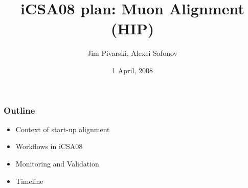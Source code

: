 \documentclass[compress]{beamer}
\title{iCSA08 plan: Muon Alignment (HIP)}
\author{Jim Pivarski, Alexei Safonov}
\institute{Texas A\&M University}
\date{ 1 April, 2008}
\begin{document}
\frame{\titlepage}


\begin{frame}
\frametitle{Outline}
\Large
\begin{itemize}\setlength{\itemsep}{0.75 cm}
\item Context of start-up alignment
\item Workflows in iCSA08
\item Monitoring and Validation
\item Timeline
\end{itemize}
\end{frame}
\end{document}
